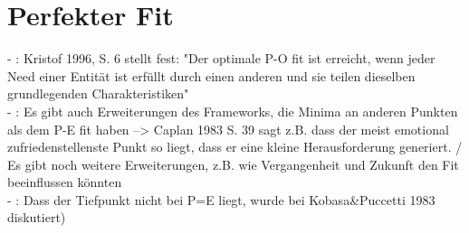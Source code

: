 \section{Perfekter Fit}
\label{ch:personEnvironmentFit:perfekterFit}
- \cite[S. 4]{edwards:2004}: Kristof 1996, S. 6 stellt fest: "Der optimale P-O fit ist erreicht, wenn jeder Need einer Entität ist erfüllt durch einen anderen und sie teilen dieselben grundlegenden Charakteristiken" \\
- \cite[S. 23]{edwards:2008}: Es gibt auch Erweiterungen des Frameworks, die Minima an anderen Punkten als dem P-E fit haben --> Caplan 1983 S. 39 sagt z.B. dass der meist emotional zufriedenstellenste Punkt so liegt, dass er eine kleine Herausforderung generiert. / Es gibt noch weitere Erweiterungen, z.B. wie Vergangenheit und Zukunft den Fit beeinflussen könnten \\
- \cite[S. 6]{caplan:1987}: Dass der Tiefpunkt nicht bei P=E liegt, wurde bei Kobasa\&Puccetti 1983 diskutiert)


